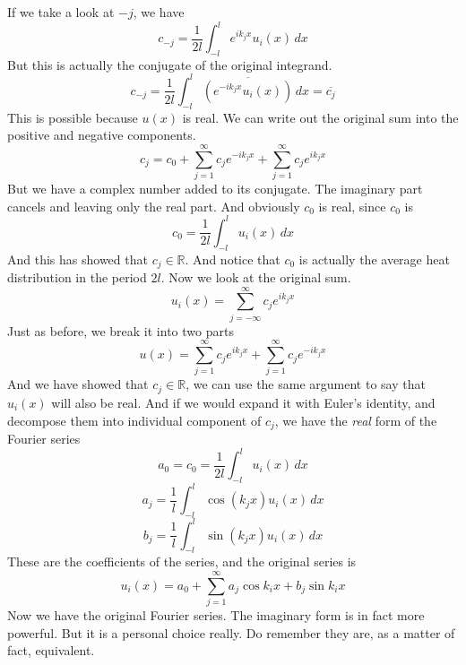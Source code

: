 \documentclass[12pt]{book}
\newcommand{\R}{\mathbb{R}}
\newcommand{\paren}[1]{\left( #1 \right)}
\begin{document}
If we take a look at $-j$, we have
\[
c_{-j} =\frac{1}{2l} \int_{-l}^{l}e^{ik_jx}u_i(x)\,dx
\]
But this is actually the conjugate of the original integrand.
\[
c_{-j} =\frac{1}{2l} \int_{-l}^{l}\overline{\paren{e^{-ik_jx}u_i(x)}}\,dx = \overline{c_j}
\]
This is possible because $u(x)$ is real. We can write out the original sum into the positive and negative components. 
\[
c_j = c_0 + \sum_{j=1}^{\infty}c_je^{-ik_jx} + \sum_{j=1}^{\infty}c_je^{ik_jx}
\]
But we have a complex number added to its conjugate. The imaginary part cancels and leaving only the real part. And obviously $c_0$ is real, since $c_0$ is
\[
c_0 = \frac{1}{2l}\int_{-l}^{l}u_i(x)\,dx
\]
And this has showed that $c_j \in \R$. And notice that $c_0$ is actually the average heat distribution in the period $2l$. Now we look at the original sum.
\[
u_i(x) = \sum_{j=-\infty}^{\infty} c_je^{ik_j x} 
\]
Just as before, we break it into two parts
\[
u(x) = \sum_{j=1}^{\infty} c_je^{ik_j x} + \sum_{j=1}^{\infty} c_je^{-ik_j x}
\]
And we have showed that $c_j \in \R$, we can use the same argument to say that $u_i(x)$ will also be real. And if we would expand it with Euler's identity, and decompose them into individual component of $c_j$, we have the \textit{real} form of the Fourier series
\[
a_0 = c_0 = \frac{1}{2l}\int_{-l}^l u_i(x)\,dx
\]
\[
a_j = \frac{1}{l}\int_{-l}^{l}\cos\paren{ k_j x }u_i(x)\,dx
\]
\[
b_j = \frac{1}{l}\int_{-l}^{l}\sin \paren{k_j x }u_i(x)\,dx
\]
These are the coefficients of the series, and the original series is
\[
u_i(x) = a_0 + \sum_{j=1}^{\infty} a_j\cos k_ix +b_j\sin k_i x
\]
Now we have the original Fourier series. The imaginary form is in fact more powerful. But it is a personal choice really. Do remember they are, as a matter of fact, equivalent. 
\end{document}
